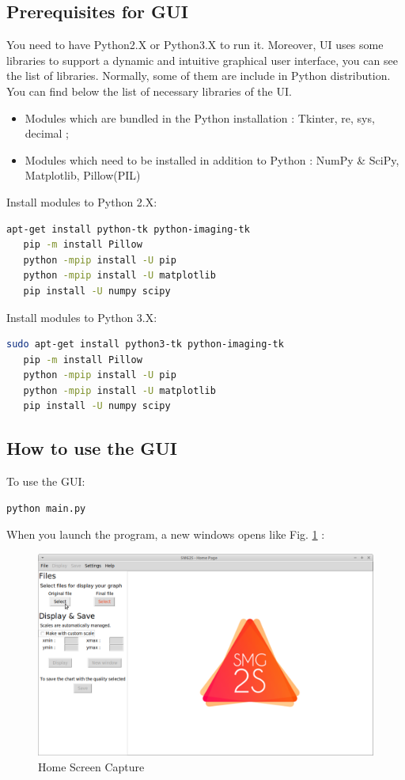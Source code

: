 \documentclass[a4paper, 10 pt]{report}
\begin{document}
	\subsection{Prerequisites for GUI}
	
	You need to have Python2.X or Python3.X to run it. Moreover, UI uses some libraries to support a dynamic and intuitive graphical user interface, you can see the list of libraries. Normally, some of them are include in Python distribution. You can find below the list of necessary libraries of the UI.
	
	\begin{itemize}
		\item Modules which are bundled in the Python installation : Tkinter, re, sys, decimal ;
		\item Modules which need to be installed in addition to Python : NumPy \& SciPy, Matplotlib, Pillow(PIL)
	\end{itemize}

	Install modules to Python 2.X:
	\begin{lstlisting}[language=bash,frame=single]
   apt-get install python-tk python-imaging-tk
   pip -m install Pillow
   python -mpip install -U pip
   python -mpip install -U matplotlib
   pip install -U numpy scipy
	\end{lstlisting}

	Install modules to Python 3.X:
	\begin{lstlisting}[language=bash,frame=single]
   sudo apt-get install python3-tk python-imaging-tk
   pip -m install Pillow
   python -mpip install -U pip
   python -mpip install -U matplotlib
   pip install -U numpy scipy
	\end{lstlisting}

	\subsection{How to use the GUI}
	
	To use the GUI:
	\begin{lstlisting}[language=bash,frame=single]
   python main.py
    \end{lstlisting}

When you launch the program, a new windows opens like Fig. \ref{fig:Home Screen Capture} :

	\begin{figure}[htbp]
		\label{fig:Home Screen Capture}
		\caption{Home Screen Capture}
		\centering
		\includegraphics[width=12cm]{home.png}
	\end{figure}
\end{document}
